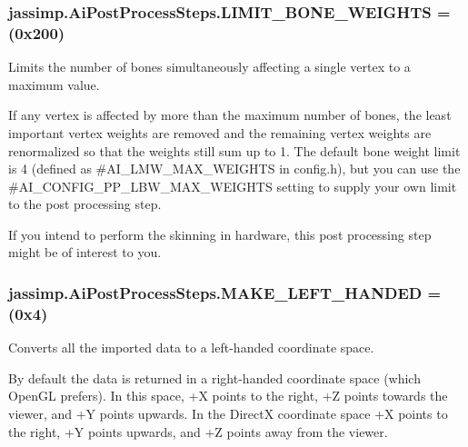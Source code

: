 {{\subsubsection[{L\+I\+M\+I\+T\+\_\+\+B\+O\+N\+E\+\_\+\+W\+E\+I\+G\+H\+T\+S}]{\setlength{\rightskip}{0pt plus 5cm}jassimp.\+Ai\+Post\+Process\+Steps.\+L\+I\+M\+I\+T\+\_\+\+B\+O\+N\+E\+\_\+\+W\+E\+I\+G\+H\+T\+S =(0x200)}}\label{enumjassimp_1_1_ai_post_process_steps_a0cbfe3bff3f0f47dd779609cbf977529}
Limits the number of bones simultaneously affecting a single vertex to a maximum value.

If any vertex is affected by more than the maximum number of bones, the least important vertex weights are removed and the remaining vertex weights are renormalized so that the weights still sum up to 1. The default bone weight limit is 4 (defined as {\ttfamily \#\+A\+I\+\_\+\+L\+M\+W\+\_\+\+M\+A\+X\+\_\+\+W\+E\+I\+G\+H\+T\+S} in config.\+h), but you can use the {\ttfamily \#\+A\+I\+\_\+\+C\+O\+N\+F\+I\+G\+\_\+\+P\+P\+\_\+\+L\+B\+W\+\_\+\+M\+A\+X\+\_\+\+W\+E\+I\+G\+H\+T\+S} setting to supply your own limit to the post processing step.

If you intend to perform the skinning in hardware, this post processing step might be of interest to you. \hypertarget{enumjassimp_1_1_ai_post_process_steps_af605bf70f0a61961ff0efdf9f21e0622}{
\subsubsection[{M\+A\+K\+E\+\_\+\+L\+E\+F\+T\+\_\+\+H\+A\+N\+D\+E\+D}]{\setlength{\rightskip}{0pt plus 5cm}jassimp.\+Ai\+Post\+Process\+Steps.\+M\+A\+K\+E\+\_\+\+L\+E\+F\+T\+\_\+\+H\+A\+N\+D\+E\+D =(0x4)}}\label{enumjassimp_1_1_ai_post_process_steps_af605bf70f0a61961ff0efdf9f21e0622}
Converts all the imported data to a left-\/handed coordinate space.

By default the data is returned in a right-\/handed coordinate space (which Open\+G\+L prefers). In this space, +\+X points to the right, +\+Z points towards the viewer, and +\+Y points upwards. In the Direct\+X coordinate space +\+X points to the right, +\+Y points upwards, and +\+Z points away from the viewer.

}
